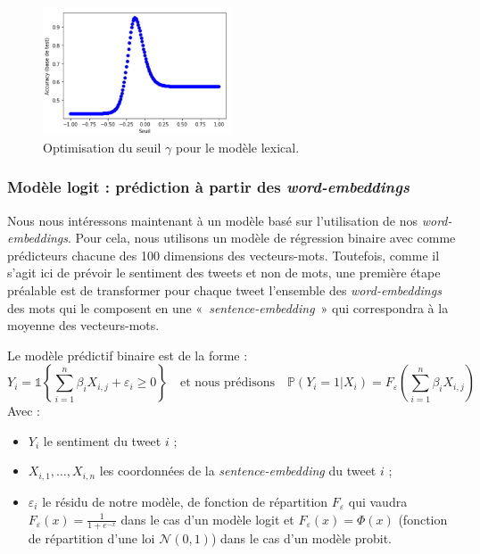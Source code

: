 \documentclass[11pt,french,french]{article}
\begin{document}
\begin{figure}[h]
\begin{center}
\includegraphics[width=0.5\textwidth]{img/max_baseline.png}
\captionsetup{margin=0cm,format=hang,justification=justified}
\caption{Optimisation du seuil $\gamma$ pour le modèle lexical.}\label{fig:max_baseline}
\end{center}
\end{figure}

\subsubsection{\texorpdfstring{Modèle logit : prédiction à partir des
\emph{word-embeddings}}{Modèle logit : prédiction à partir des word-embeddings}}\label{sec:wordembeddings}

Nous nous intéressons maintenant à un modèle basé sur l'utilisation de
nos \emph{word-embeddings}. Pour cela, nous utilisons un modèle de
régression binaire avec comme prédicteurs chacune des 100 dimensions des
vecteurs-mots. Toutefois, comme il s'agit ici de prévoir le sentiment
des tweets et non de mots, une première étape préalable est de
transformer pour chaque tweet l'ensemble des \emph{word-embeddings} des
mots qui le composent en une «~\emph{sentence-embedding}~» qui
correspondra à la moyenne des vecteurs-mots.

Le modèle prédictif binaire est de la forme : \[
Y_i = \mathds{1}\left\{ \sum_{i = 1}^n \beta_i X_{i,j} + \varepsilon_i \geq 0 \right\} 
\quad 
\text{et nous prédisons} 
\quad  
\mathbb{P}(Y_i = 1 | X_{i}) = F_{\varepsilon}\left(\sum_{i = 1}^n \beta_i X_{i,j}\right)
\] Avec :

\begin{itemize}
\item $Y_i$ le sentiment du tweet $i$ ;
\item $X_{i,1}, \dots, X_{i,n}$ les coordonnées de la \emph{sentence-embedding} du tweet $i$ ;
\item $\varepsilon_i$ le résidu de notre modèle, de fonction de répartition $F_{\varepsilon}$ qui vaudra $F_{\varepsilon}(x) = \frac{1}{1 + e^{-x}}$ dans le cas d'un modèle logit et $F_{\varepsilon}(x) = \Phi(x)$ (fonction de répartition d'une loi $\mathcal{N}(0, 1)$) dans le cas d'un modèle probit. 
\end{itemize}
\end{document}
